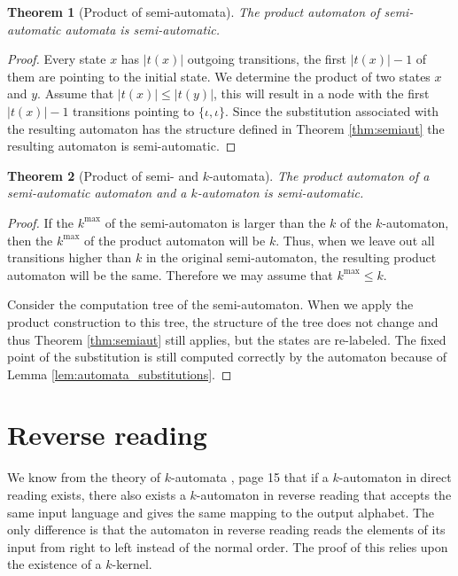 \documentclass{article}
\newtheorem{theorem}{Theorem}[subsection]
\theoremstyle{definition}
\begin{document}
\begin{theorem}[Product of semi-automata]
The product automaton of semi-automatic automata is semi-automatic.
\end{theorem}
\begin{proof}
Every state $x$ has $|t(x)|$ outgoing transitions, the first $|t(x)| - 1$ of 
them are pointing to the initial state. We determine the product of two states 
$x$ and $y$. Assume that $|t(x)| \le |t(y)|$, this will result in a node with 
the first $|t(x)| - 1$ transitions pointing to $\{\iota, \iota\}$. Since the 
substitution associated with the resulting automaton has the structure defined 
in Theorem \ref{thm:semiaut} the resulting automaton is semi-automatic.
\end{proof}

\begin{theorem}[Product of semi- and $k$-automata]
The product automaton of a semi-automatic automaton and a $k$-automaton is
semi-automatic.
\end{theorem}
\begin{proof}
If the $k^{\mathrm{max}}$ of the semi-automaton is larger than the $k$ of
the $k$-automaton, then the $k^{\mathrm{max}}$ of the product automaton will
be $k$. Thus, when we leave out all transitions higher than $k$ in the
original semi-automaton, the resulting product automaton will be the same.
Therefore we may assume that $k^{\mathrm{max}} \le k$. 

Consider the computation tree of the semi-automaton. When we apply the product 
construction to this tree, the structure of the tree does not change and thus 
Theorem \ref{thm:semiaut} still applies, but the states are re-labeled. The 
fixed point of the substitution is still computed correctly by the automaton 
because of Lemma \ref{lem:automata_substitutions}.
\end{proof}

\section{Reverse reading}
We know from the theory of $k$-automata \cite{Fogg}, page 15 that if a 
$k$-automaton in direct reading exists, there also exists a $k$-automaton in 
reverse reading that accepts the same input language and gives the same 
mapping to the output alphabet. The only difference is that the automaton in
reverse reading reads the elements of its input from right to left instead of 
the normal order. The proof of this relies upon the existence of a $k$-kernel.
\end{document}
